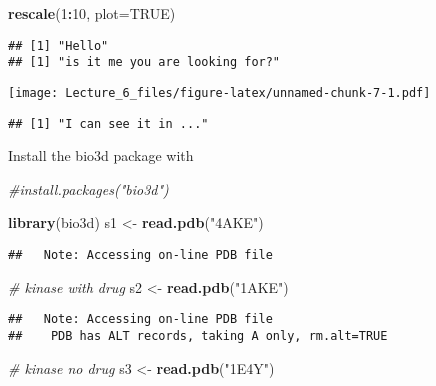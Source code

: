 \documentclass[]{article}
\newenvironment{Shaded}{\begin{snugshade}}{\end{snugshade}}
\newcommand{\CommentTok}[1]{\textcolor[rgb]{0.56,0.35,0.01}{\textit{#1}}}
\newcommand{\DataTypeTok}[1]{\textcolor[rgb]{0.13,0.29,0.53}{#1}}
\newcommand{\DecValTok}[1]{\textcolor[rgb]{0.00,0.00,0.81}{#1}}
\newcommand{\KeywordTok}[1]{\textcolor[rgb]{0.13,0.29,0.53}{\textbf{#1}}}
\newcommand{\NormalTok}[1]{#1}
\newcommand{\OperatorTok}[1]{\textcolor[rgb]{0.81,0.36,0.00}{\textbf{#1}}}
\newcommand{\OtherTok}[1]{\textcolor[rgb]{0.56,0.35,0.01}{#1}}
\newcommand{\StringTok}[1]{\textcolor[rgb]{0.31,0.60,0.02}{#1}}
\begin{document}
\begin{Shaded}
\begin{Highlighting}[]
\KeywordTok{rescale}\NormalTok{(}\DecValTok{1}\OperatorTok{:}\DecValTok{10}\NormalTok{, }\DataTypeTok{plot=}\OtherTok{TRUE}\NormalTok{)}
\end{Highlighting}
\end{Shaded}

\begin{verbatim}
## [1] "Hello"
## [1] "is it me you are looking for?"
\end{verbatim}

\texttt{[image: Lecture\_6\_files/figure-latex/unnamed-chunk-7-1.pdf]}

\begin{verbatim}
## [1] "I can see it in ..."
\end{verbatim}

Install the bio3d package with

\begin{Shaded}
\begin{Highlighting}[]
\CommentTok{#install.packages("bio3d")}
\end{Highlighting}
\end{Shaded}

\begin{Shaded}
\begin{Highlighting}[]
\KeywordTok{library}\NormalTok{(bio3d)}
\NormalTok{s1 <-}\StringTok{ }\KeywordTok{read.pdb}\NormalTok{(}\StringTok{"4AKE"}\NormalTok{)}
\end{Highlighting}
\end{Shaded}

\begin{verbatim}
##   Note: Accessing on-line PDB file
\end{verbatim}

\begin{Shaded}
\begin{Highlighting}[]
\CommentTok{# kinase with drug}
\NormalTok{s2 <-}\StringTok{ }\KeywordTok{read.pdb}\NormalTok{(}\StringTok{"1AKE"}\NormalTok{)}
\end{Highlighting}
\end{Shaded}

\begin{verbatim}
##   Note: Accessing on-line PDB file
##    PDB has ALT records, taking A only, rm.alt=TRUE
\end{verbatim}

\begin{Shaded}
\begin{Highlighting}[]
\CommentTok{# kinase no drug}
\NormalTok{s3 <-}\StringTok{ }\KeywordTok{read.pdb}\NormalTok{(}\StringTok{"1E4Y"}\NormalTok{)}
\end{Highlighting}
\end{Shaded}
\end{document}
